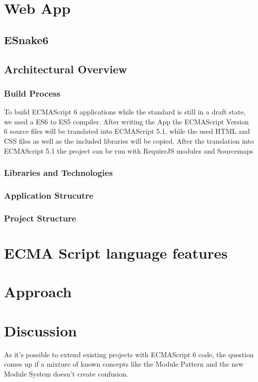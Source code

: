 \documentclass{bioinfo}
\begin{document}
\section{Web App}

\subsection{ESnake6}

\subsection{Architectural Overview}
\subsubsection{Build Process}
To build ECMAScript 6 applications while the standard is still in a draft state, we used a ES6 to ES5 compiler.
After writing the App the ECMAScript Version 6 source files will be translated into ECMAScript 5.1. while the 
used HTML and CSS files as well as the included libraries will be copied. After the translation into ECMAScript 5.1
the project can be run with RequireJS modules and Sourcemaps %
\subsubsection{Libraries and Technologies}
\subsubsection{Application Strucutre}
\subsubsection{Project Structure}

\section{ECMA Script language features}


\section{Approach}

\section{Discussion}
As it's possible to extend existing projects with ECMAScript 6 code, the question comes up if a mixture of known concepts like the Module Pattern 
and the new Module System doesn't create confusion. 
\end{document}
